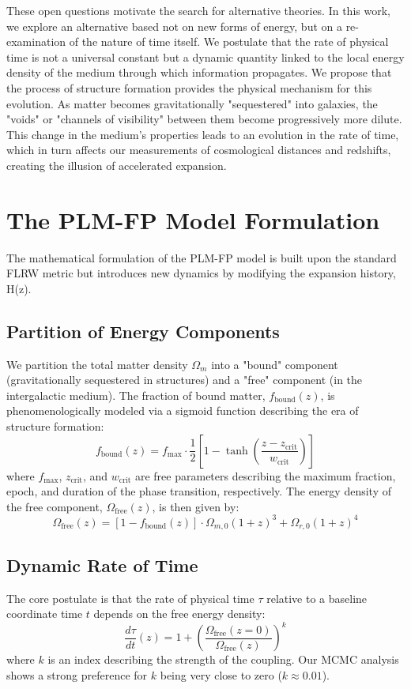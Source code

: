 \documentclass[12pt, a4paper]{article}
\begin{document}
These open questions motivate the search for alternative theories. In this work, we explore an alternative based not on new forms of energy, but on a re-examination of the nature of time itself. We postulate that the rate of physical time is not a universal constant but a dynamic quantity linked to the local energy density of the medium through which information propagates. We propose that the process of structure formation provides the physical mechanism for this evolution. As matter becomes gravitationally "sequestered" into galaxies, the "voids" or "channels of visibility" between them become progressively more dilute. This change in the medium's properties leads to an evolution in the rate of time, which in turn affects our measurements of cosmological distances and redshifts, creating the illusion of accelerated expansion.

\section{The PLM-FP Model Formulation}
The mathematical formulation of the PLM-FP model is built upon the standard FLRW metric but introduces new dynamics by modifying the expansion history, H(z).

\subsection{Partition of Energy Components}
We partition the total matter density $\Omega_m$ into a "bound" component (gravitationally sequestered in structures) and a "free" component (in the intergalactic medium). The fraction of bound matter, $f_{\text{bound}}(z)$, is phenomenologically modeled via a sigmoid function describing the era of structure formation:
\begin{equation}
f_{\text{bound}}(z) = f_{\max} \cdot \frac{1}{2} \left[1 - \tanh\left(\frac{z - z_{\text{crit}}}{w_{\text{crit}}}\right)\right]
\label{eq:fbound}
\end{equation}
where $f_{\max}$, $z_{\text{crit}}$, and $w_{\text{crit}}$ are free parameters describing the maximum fraction, epoch, and duration of the phase transition, respectively. The energy density of the free component, $\Omega_{\text{free}}(z)$, is then given by:
\begin{equation}
\Omega_{\text{free}}(z) = [1 - f_{\text{bound}}(z)] \cdot \Omega_{m,0} (1+z)^3 + \Omega_{r,0} (1+z)^4
\label{eq:omegafree}
\end{equation}

\subsection{Dynamic Rate of Time}
The core postulate is that the rate of physical time $\tau$ relative to a baseline coordinate time $t$ depends on the free energy density:
\begin{equation}
\frac{d\tau}{dt}(z) = 1 + \left( \frac{\Omega_{\text{free}}(z=0)}{\Omega_{\text{free}}(z)} \right)^k
\label{eq:dtau_dt}
\end{equation}
where $k$ is an index describing the strength of the coupling. Our MCMC analysis shows a strong preference for $k$ being very close to zero ($k \approx 0.01$).
\end{document}
